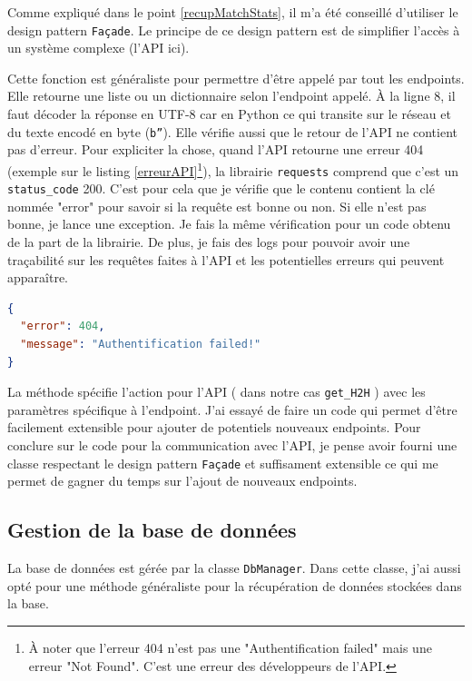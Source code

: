 \documentclass[a4paper,14pt]{extarticle}
\begin{document}
{Comme expliqué dans le point \ref{recupMatchStats}, il m'a été conseillé d'utiliser le design pattern \texttt{Façade}. Le principe de ce design pattern est de simplifier l'accès à un système complexe (l'API ici).


Cette fonction est généraliste pour permettre d'être appelé par tout les endpoints. Elle retourne une liste ou un dictionnaire selon l'endpoint appelé. À la ligne 8, il faut décoder la réponse en UTF-8 car en Python ce qui transite sur le réseau et du texte encodé en byte (\texttt{b''}). 
Elle vérifie aussi que le retour de l'API ne contient pas d'erreur. Pour expliciter la chose, quand l'API retourne une erreur 404 (exemple sur le listing \ref{erreurAPI}\footnote{À noter que l'erreur 404 n'est pas une "Authentification failed" mais une erreur "Not Found". C'est une erreur des développeurs de l'API. }), la librairie \texttt{requests} comprend que c'est un \texttt{status\_code} 200. C'est pour cela que je vérifie que le contenu contient la clé nommée "error" pour savoir si la requête est bonne ou non. Si elle n'est pas bonne, je lance une exception. Je fais la même vérification pour un code obtenu de la part de la librairie.
De plus, je fais des logs pour pouvoir avoir une traçabilité sur les requêtes faites à l'API et les potentielles erreurs qui peuvent apparaître.

\begin{lstlisting}[language=json, firstnumber=1, caption=Retour d'une erreur de l'API, captionpos=b, label=erreurAPI]
{
  "error": 404,
  "message": "Authentification failed!"
}
\end{lstlisting}


La méthode spécifie l'action pour l'API ( dans notre cas \texttt{get\_H2H} ) avec les paramètres spécifique à l'endpoint.
J'ai essayé de faire un code qui permet d'être facilement extensible pour ajouter de potentiels nouveaux endpoints. Pour conclure sur le code pour la communication avec l'API, je pense avoir fourni une classe respectant le design pattern \texttt{Façade} et suffisament extensible ce qui me permet de gagner du temps sur l'ajout de nouveaux endpoints.

\subsection{Gestion de la base de données}

La base de données est gérée par la classe \texttt{DbManager}. Dans cette classe, j'ai aussi opté pour une méthode généraliste pour la récupération de données stockées dans la base.

}
\end{document}
